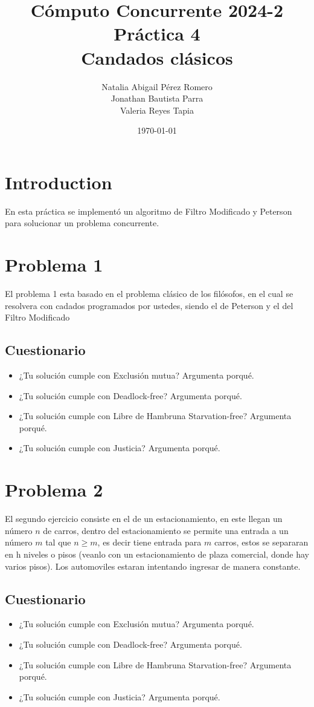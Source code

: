 \documentclass{article}
\title{Cómputo Concurrente 2024-2 \\ Práctica 4 \\  Candados clásicos}
\author{Natalia Abigail Pérez Romero\\
Jonathan Bautista Parra \\ Valeria Reyes Tapia}
\date{\today}
\begin{document}
\maketitle
\section{Introduction}
En esta práctica se implementó un algoritmo de Filtro Modificado y Peterson para solucionar un problema concurrente. 

\section{Problema 1}
El problema 1 esta basado en el problema clásico de los filósofos, en el cual se resolvera con cadados programados por ustedes, siendo el de Peterson y el del Filtro Modificado

\subsection{Cuestionario}

\begin{itemize}
    \item ¿Tu solución cumple con Exclusión mutua? Argumenta porqué.
    \item ¿Tu solución cumple con Deadlock-free? Argumenta porqué.
    \item ¿Tu solución cumple con Libre de Hambruna Starvation-free? Argumenta porqué.
    \item ¿Tu solución cumple con Justicia? Argumenta porqué.
\end{itemize}

\section{Problema 2}
El segundo ejercicio consiste en el de un estacionamiento, en este llegan un número $n$ de carros, dentro del estacionamiento se permite una entrada a un número $m$ tal que $n \geq m$, es decir tiene entrada para $m$ carros, estos se separaran en h niveles o pisos (veanlo con un estacionamiento de plaza comercial, donde hay varios pisos). Los automoviles estaran intentando ingresar de manera constante.

\subsection{Cuestionario}

\begin{itemize}
    \item ¿Tu solución cumple con Exclusión mutua? Argumenta porqué.
    \item ¿Tu solución cumple con Deadlock-free? Argumenta porqué.
    \item ¿Tu solución cumple con Libre de Hambruna Starvation-free? Argumenta porqué.
    \item ¿Tu solución cumple con Justicia? Argumenta porqué.
\end{itemize}
\end{document}
